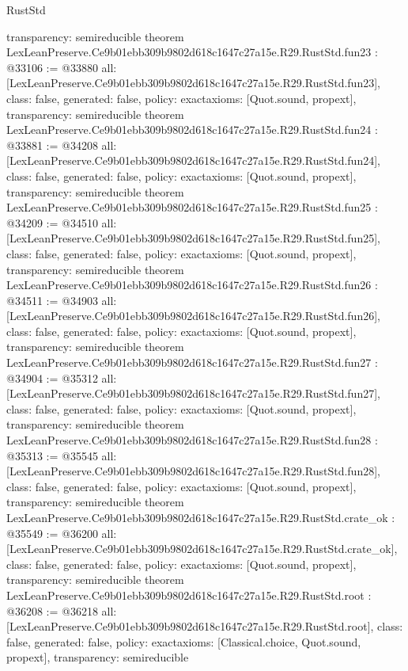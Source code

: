 \begin{lexlean}{RustStd}
\begin{coremodule}
{  transparency: semireducible
}
theorem LexLeanPreserve.Ce9b01ebb309b9802d618c1647c27a15e.R29.RustStd.fun23 : @33106 := @33880 {
  all: [LexLeanPreserve.Ce9b01ebb309b9802d618c1647c27a15e.R29.RustStd.fun23],
  class: false,
  generated: false,
  policy: exact{axioms: [Quot.sound, propext]},
  transparency: semireducible
}
theorem LexLeanPreserve.Ce9b01ebb309b9802d618c1647c27a15e.R29.RustStd.fun24 : @33881 := @34208 {
  all: [LexLeanPreserve.Ce9b01ebb309b9802d618c1647c27a15e.R29.RustStd.fun24],
  class: false,
  generated: false,
  policy: exact{axioms: [Quot.sound, propext]},
  transparency: semireducible
}
theorem LexLeanPreserve.Ce9b01ebb309b9802d618c1647c27a15e.R29.RustStd.fun25 : @34209 := @34510 {
  all: [LexLeanPreserve.Ce9b01ebb309b9802d618c1647c27a15e.R29.RustStd.fun25],
  class: false,
  generated: false,
  policy: exact{axioms: [Quot.sound, propext]},
  transparency: semireducible
}
theorem LexLeanPreserve.Ce9b01ebb309b9802d618c1647c27a15e.R29.RustStd.fun26 : @34511 := @34903 {
  all: [LexLeanPreserve.Ce9b01ebb309b9802d618c1647c27a15e.R29.RustStd.fun26],
  class: false,
  generated: false,
  policy: exact{axioms: [Quot.sound, propext]},
  transparency: semireducible
}
theorem LexLeanPreserve.Ce9b01ebb309b9802d618c1647c27a15e.R29.RustStd.fun27 : @34904 := @35312 {
  all: [LexLeanPreserve.Ce9b01ebb309b9802d618c1647c27a15e.R29.RustStd.fun27],
  class: false,
  generated: false,
  policy: exact{axioms: [Quot.sound, propext]},
  transparency: semireducible
}
theorem LexLeanPreserve.Ce9b01ebb309b9802d618c1647c27a15e.R29.RustStd.fun28 : @35313 := @35545 {
  all: [LexLeanPreserve.Ce9b01ebb309b9802d618c1647c27a15e.R29.RustStd.fun28],
  class: false,
  generated: false,
  policy: exact{axioms: [Quot.sound, propext]},
  transparency: semireducible
}
theorem LexLeanPreserve.Ce9b01ebb309b9802d618c1647c27a15e.R29.RustStd.crate_ok : @35549 := @36200 {
  all: [LexLeanPreserve.Ce9b01ebb309b9802d618c1647c27a15e.R29.RustStd.crate_ok],
  class: false,
  generated: false,
  policy: exact{axioms: [Quot.sound, propext]},
  transparency: semireducible
}
theorem LexLeanPreserve.Ce9b01ebb309b9802d618c1647c27a15e.R29.RustStd.root : @36208 := @36218 {
  all: [LexLeanPreserve.Ce9b01ebb309b9802d618c1647c27a15e.R29.RustStd.root],
  class: false,
  generated: false,
  policy: exact{axioms: [Classical.choice, Quot.sound, propext]},
  transparency: semireducible
}


\end{coremodule}
\end{lexlean}
